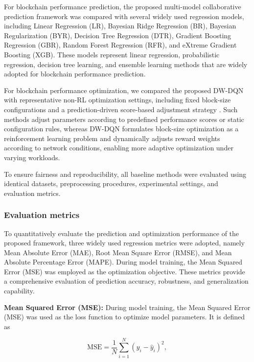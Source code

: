 \documentclass[a4paper,fleqn]{cas-dc}
\begin{document}
For blockchain performance prediction, the proposed multi-model collaborative prediction framework was compared with several widely used regression models, including Linear Regression (LR), Bayesian Ridge Regression (BR), Bayesian Regularization (BYR), Decision Tree Regression (DTR), Gradient Boosting Regression (GBR), Random Forest Regression (RFR), and eXtreme Gradient Boosting (XGB). These models represent linear regression, probabilistic regression, decision tree learning, and ensemble learning methods that are widely adopted for blockchain performance prediction.

For blockchain performance optimization, we compared the proposed DW-DQN with representative non-RL optimization settings, including fixed block-size configurations and a prediction-driven score-based adjustment strategy \citep{wang2023learningchain}. Such methods adjust parameters according to predefined performance scores or static configuration rules, whereas DW-DQN formulates block-size optimization as a reinforcement learning problem and dynamically adjusts reward weights according to network conditions, enabling more adaptive optimization under varying workloads.

To ensure fairness and reproducibility, all baseline methods were evaluated using identical datasets, preprocessing procedures, experimental settings, and evaluation metrics.

\subsubsection{Evaluation metrics}
\vspace{6pt}
To quantitatively evaluate the prediction and optimization performance of the proposed framework, three widely used regression metrics were adopted, namely Mean Absolute Error (MAE), Root Mean Square Error (RMSE), and Mean Absolute Percentage Error (MAPE). During model training, the Mean Squared Error (MSE) was employed as the optimization objective. These metrics provide a comprehensive evaluation of prediction accuracy, robustness, and generalization capability.

\textbf{Mean Squared Error (MSE):}
During model training, the Mean Squared Error (MSE) was used as the loss function to optimize model parameters. It is defined as

\begin{equation}
	\mathrm{MSE}=\frac{1}{N}\sum_{i=1}^{N}(y_i-\hat{y}_i)^2,
\end{equation}
\end{document}
